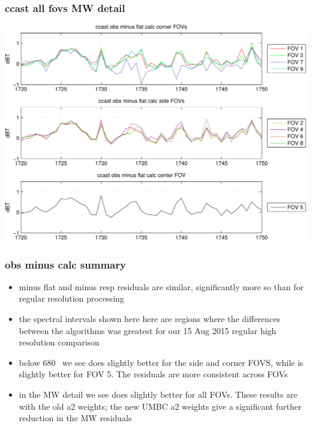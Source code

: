 \documentclass[11pt]{beamer}
\begin{document}
\begin{frame}
\frametitle{ccast all fovs MW detail}
\begin{center}
  \includegraphics[scale=0.5]{figures/cal_ccast_MW.pdf}
\end{center}
\end{frame}
\begin{frame}
\frametitle{obs minus calc summary}

\begin{itemize}

  \item {\ccast} minus flat and {\noaa} minus resp residuals are
    similar, significantly more so than for regular resolution
    processing

  \item the spectral intervals shown here here are regions where the
    differences between the algorithms was greatest for our 15 Aug
    2015 regular high resolution comparison

  \item below 680 \wn\ we see {\ccast} does slightly better for the
    side and corner FOVS, while {\noaa} is slightly better for FOV 5.  
    The {\ccast} residuals are more consistent across FOVs

  \item in the MW detail we see {\ccast} does slightly better for
    all FOVs.  These results are with the old a2 weights; the new
    UMBC a2 weights give a significant further reduction in the MW
    residuals

\end{itemize}

\end{frame}
\end{document}
